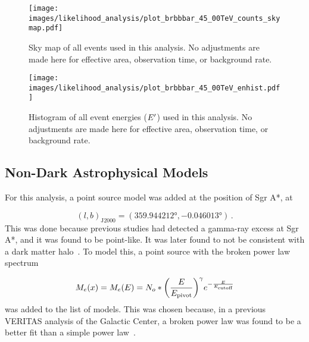   \begin{figure}[bt]
    \centering
    \texttt{[image: images/likelihood\_analysis/plot\_brbbbar\_45\_00TeV\_counts\_skymap.pdf]}
    \caption[Galactic Center Counts Sky Map]{
      Sky map of all events used in this analysis.
      No adjustments are made here for effective area, observation time, or background rate.
    }
    \label{fig:gc_counts_skymap}
  \end{figure}
  
  \begin{figure}[tb]
    \centering
    \texttt{[image: images/likelihood\_analysis/plot\_brbbbar\_45\_00TeV\_enhist.pdf]}
    \caption[Galactic Center Counts Energy Histogram]{
      Histogram of all event energies ($E'$) used in this analysis.
      No adjustments are made here for effective area, observation time, or background rate.
    }
    \label{fig:gc_counts_enhist}
  \end{figure}

  \FloatBarrier

  \subsection{Non-Dark Astrophysical Models}\label{subsec:gcpointsrc}
  For this analysis, a point source model was added at the position of Sgr A*, at
  
  $$(l,b)_{\textrm{J2000}} = (\ang{359.944212}, \ang{-0.046013}) \,. $$
  This was done because previous studies had detected a gamma-ray excess at Sgr A*, and it was found to be point-like.
  It was later found to not be consistent with a dark matter halo~\cite{gc_pnt_is_not_dm1, gc_pnt_is_not_dm2, gc_pnt_is_not_dm3}.
  To model this, a point source with the broken power law spectrum 

  \begin{equation}\label{eqn:brokenplaw}
    M_e(x) = M_e(E) = N_o * { \left ( \frac{E}{E_{\textrm{pivot}}} \right ) }^{\gamma} {e}^{-\frac{E}{E_{\textrm{cutoff}}}}
  \end{equation}
  was added to the list of models.
  This was chosen because, in a previous VERITAS analysis of the Galactic Center, a broken power law was found to be a better fit than a simple power law~\cite{VeritasGCRidge2015}.
  
